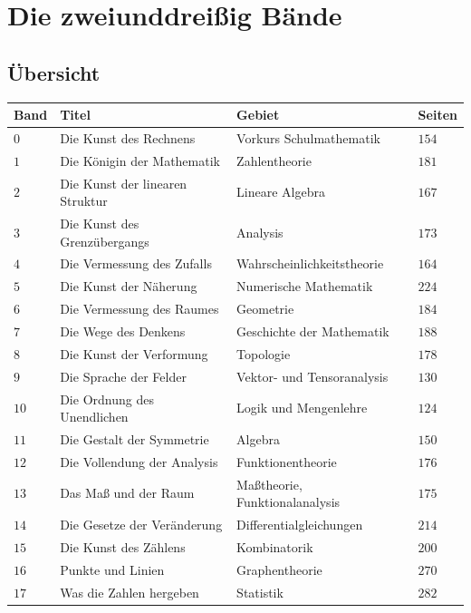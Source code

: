 \chapter{Die zweiunddreißig Bände}

\section{Übersicht}

\begin{center}
{\small
\renewcommand{\arraystretch}{1.42}
\begin{longtable}{@{}P{1.4cm}P{4.2cm}P{4.2cm}P{1.3cm}@{}}
\toprule
\textbf{Band} & \textbf{Titel} & \textbf{Gebiet} & \textbf{Seiten}\\
\midrule
\endhead
$0$ & Die Kunst des Rechnens & Vorkurs Schulmathematik & $154$\\
$1$ & Die Königin der Mathematik & Zahlentheorie & $181$\\
$2$ & Die Kunst der linearen Struktur & Lineare Algebra & $167$\\
$3$ & Die Kunst des Grenzübergangs & Analysis & $173$\\
$4$ & Die Vermessung des Zufalls & Wahrscheinlichkeitstheorie & $164$\\
$5$ & Die Kunst der Näherung & Numerische Mathematik & $224$\\
$6$ & Die Vermessung des Raumes & Geometrie & $184$\\
$7$ & Die Wege des Denkens & Geschichte der Mathematik & $188$\\
$8$ & Die Kunst der Verformung & Topologie & $178$\\
$9$ & Die Sprache der Felder & Vektor- und Tensoranalysis & $130$\\
$10$ & Die Ordnung des Unendlichen & Logik und Mengenlehre & $124$\\
$11$ & Die Gestalt der Symmetrie & Algebra & $150$\\
$12$ & Die Vollendung der Analysis & Funktionentheorie & $176$\\
$13$ & Das Maß und der Raum & Maßtheorie, Funktionalanalysis & $175$\\
$14$ & Die Gesetze der Veränderung & Differentialgleichungen & $214$\\
$15$ & Die Kunst des Zählens & Kombinatorik & $200$\\
\midrule
$16$ & Punkte und Linien & Graphentheorie & $270$\\
$17$ & Was die Zahlen hergeben & Statistik & $282$\\

\end{longtable}}
\end{center}
